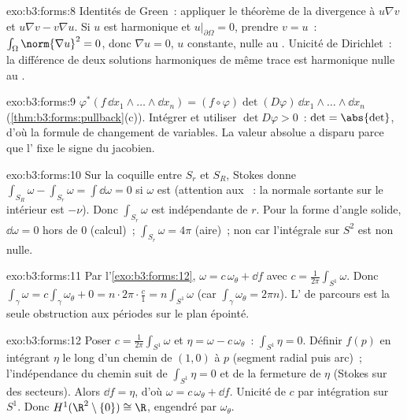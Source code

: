 \begin{solution}{exo:b3:forms:8}
Identités de Green~: appliquer le théorème de la divergence
à $u\nabla v$ et $u\nabla v - v\nabla u$. Si $u$ est
harmonique et $u|_{\partial\Omega} = 0$, prendre $v = u$~:
$\int_\Omega\norm{\nabla u}^2 = 0$, donc $\nabla u = 0$, $u$
constante, nulle au . Unicité de Dirichlet~: la
différence de deux solutions harmoniques de même trace est
harmonique nulle au .
\end{solution}

\begin{solution}{exo:b3:forms:9}
$\varphi^*(f\,\dd x_1\wedge\dots\wedge\dd x_n) =
(f\circ\varphi)\det(D\varphi)\,\dd x_1\wedge\dots\wedge\dd
x_n$ (\cref{thm:b3:forms:pullback}(c)). Intégrer et
utiliser $\det D\varphi > 0$~: $\det =
\abs{\det}$, d'où la formule de changement de variables. La
valeur absolue a disparu parce que l' fixe le
signe du jacobien.
\end{solution}

\begin{solution}{exo:b3:forms:10}
Sur la coquille entre $S_r$ et $S_R$, Stokes donne
$\int_{S_R}\omega - \int_{S_r}\omega = \int\dd\omega = 0$
si $\omega$ est  (attention aux ~: la
normale sortante sur le  intérieur est $-\nu$). Donc
$\int_{S_r}\omega$ est indépendante de $r$. Pour la forme
d'angle solide, $\dd\omega = 0$ hors de $0$ (calcul)~;
$\int_{S_r}\omega = 4\pi$ (aire)~; non  car
l'intégrale sur $S^2$ est non nulle.
\end{solution}

\begin{solution}{exo:b3:forms:11}
Par l'\cref{exo:b3:forms:12}, $\omega = c\,\omega_\theta +
\dd f$ avec $c = \frac1{2\pi}\int_{S^1}\omega$. Donc
$\int_\gamma\omega = c\int_\gamma\omega_\theta + 0 =
n\cdot 2\pi\cdot\frac{c}{1} = n\int_{S^1}\omega$ (car
$\int_\gamma\omega_\theta = 2\pi n$). L' de parcours
est la seule obstruction aux périodes sur le plan épointé.
\end{solution}

\begin{solution}{exo:b3:forms:12}
Poser $c = \frac1{2\pi}\int_{S^1}\omega$ et $\eta = \omega -
c\,\omega_\theta$~: $\int_{S^1}\eta = 0$. Définir $f(p)$ en
intégrant $\eta$ le long d'un chemin de $(1,0)$ à $p$
(segment radial puis arc)~; l'indépendance du chemin suit de
$\int_{S^1}\eta = 0$ et de la fermeture de $\eta$ (Stokes
sur des secteurs). Alors $\dd f = \eta$, d'où $\omega =
c\,\omega_\theta + \dd f$. Unicité de $c$ par intégration
sur $S^1$. Donc $H^1(\R^2\setminus\{0\}) \cong \R$, engendré
par $\omega_\theta$.
\end{solution}

